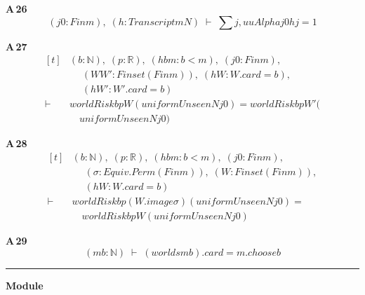 \noindent\textbf{A\,26}\quad{}
{\footnotesize\[ (\mathit{j0} : \mathit{Fin} \mathit{m}),\; (\mathit{h} : \mathit{Transcript} \mathit{m} \mathit{N}) \;\vdash\; \textstyle\sum \mathit{j}, \mathit{uuAlpha} \mathit{j0} \mathit{h} \mathit{j} = 1 \]}

\noindent\textbf{A\,27}\quad{}
{\footnotesize\[ \begin{aligned}[t]
&(\mathit{b} : \mathbb{N} ),\; (\mathit{p} : \mathbb{R} ),\; (\mathit{hbm} : \mathit{b} < \mathit{m}),\; (\mathit{j0} : \mathit{Fin} \mathit{m}),\\
&\quad \; (\mathit{W} \mathit{W'} : \mathit{Finset} (\mathit{Fin} \mathit{m})),\; (\mathit{hW} : \mathit{W}.\mathit{card} = \mathit{b}),\\
&\quad \; (\mathit{hW'} : \mathit{W'}.\mathit{card} = \mathit{b})\\
\vdash\;&\mathit{worldRisk} \mathit{b} \mathit{p} \mathit{W} (\mathit{uniformUnseen} \mathit{N} \mathit{j0}) = \mathit{worldRisk} \mathit{b} \mathit{p} \mathit{W'} (\\
&\quad \mathit{uniformUnseen} \mathit{N} \mathit{j0})
\end{aligned} \]}

\noindent\textbf{A\,28}\quad{}
{\footnotesize\[ \begin{aligned}[t]
&(\mathit{b} : \mathbb{N} ),\; (\mathit{p} : \mathbb{R} ),\; (\mathit{hbm} : \mathit{b} < \mathit{m}),\; (\mathit{j0} : \mathit{Fin} \mathit{m}),\\
&\quad \; (\sigma : \mathit{Equiv}.\mathit{Perm} (\mathit{Fin} \mathit{m})),\; (\mathit{W} : \mathit{Finset} (\mathit{Fin} \mathit{m})),\\
&\quad \; (\mathit{hW} : \mathit{W}.\mathit{card} = \mathit{b})\\
\vdash\;&\mathit{worldRisk} \mathit{b} \mathit{p} (\mathit{W}.\mathit{image} \sigma ) (\mathit{uniformUnseen} \mathit{N} \mathit{j0}) =\\
&\quad \mathit{worldRisk} \mathit{b} \mathit{p} \mathit{W} (\mathit{uniformUnseen} \mathit{N} \mathit{j0})
\end{aligned} \]}

\noindent\textbf{A\,29}\quad{}
{\footnotesize\[ (\mathit{m} \mathit{b} : \mathbb{N} ) \;\vdash\; (\mathit{worlds} \mathit{m} \mathit{b}).\mathit{card} = \mathit{m}.\mathit{choose} \mathit{b} \]}

\vspace{4pt}\noindent\rule{\columnwidth}{0.4pt}\par\vspace{2pt}
\noindent\textbf{Module }\par\vspace{3pt}

